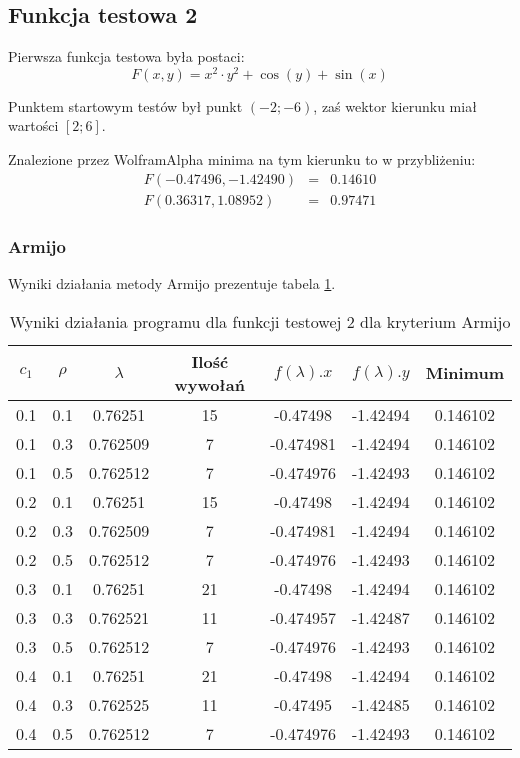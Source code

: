 \documentclass{classrep}
\begin{document}
\subsection{Funkcja testowa 2}
Pierwsza funkcja testowa była postaci:
\begin{equation}
 F(x, y) = x^2 \cdot y^2 + \cos(y) + \sin(x)
\end{equation}

Punktem startowym testów był punkt $(-2; -6)$, zaś wektor kierunku miał wartości $[2; 6]$.

Znalezione przez WolframAlpha minima na tym kierunku to w przybliżeniu:
\begin{eqnarray}
 F(-0.47496, -1.42490) & = & 0.14610 \\ 
 F( 0.36317,  1.08952) & = & 0.97471
\end{eqnarray}


\subsubsection{Armijo}

Wyniki działania metody Armijo prezentuje tabela \ref{armijo2}.

\begin{table}
  \centering
  \caption{Wyniki działania programu dla funkcji testowej 2 dla kryterium Armijo}
  \label{armijo2}
  \begin{tabular}{|c|c|c|c|c|c|c|}
    \hline
    $c_1$ & $\rho$ & $\lambda$ & Ilość wywołań & $f(\lambda).x$ & $f(\lambda).y$ & Minimum \\
    \hline
    0.1 & 0.1 & 0.76251 & 15 & -0.47498 & -1.42494 & 0.146102 \\
    0.1 & 0.3 & 0.762509 & 7 & -0.474981 & -1.42494 & 0.146102 \\
    0.1 & 0.5 & 0.762512 & 7 & -0.474976 & -1.42493 & 0.146102 \\
    0.2 & 0.1 & 0.76251 & 15 & -0.47498 & -1.42494 & 0.146102 \\
    0.2 & 0.3 & 0.762509 & 7 & -0.474981 & -1.42494 & 0.146102 \\
    0.2 & 0.5 & 0.762512 & 7 & -0.474976 & -1.42493 & 0.146102 \\
    0.3 & 0.1 & 0.76251 & 21 & -0.47498 & -1.42494 & 0.146102 \\
    0.3 & 0.3 & 0.762521 & 11 & -0.474957 & -1.42487 & 0.146102 \\
    0.3 & 0.5 & 0.762512 & 7 & -0.474976 & -1.42493 & 0.146102 \\
    0.4 & 0.1 & 0.76251 & 21 & -0.47498 & -1.42494 & 0.146102 \\
    0.4 & 0.3 & 0.762525 & 11 & -0.47495 & -1.42485 & 0.146102 \\
    0.4 & 0.5 & 0.762512 & 7 & -0.474976 & -1.42493 & 0.146102 \\
    \hline
  \end{tabular}
\end{table}
\end{document}
